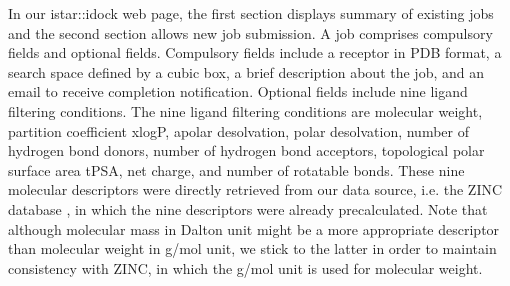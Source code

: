 In our istar::idock web page, the first section displays summary of existing jobs and the second section allows new job submission. A job comprises compulsory fields and optional fields. Compulsory fields include a receptor in PDB format, a search space defined by a cubic box, a brief description about the job, and an email to receive completion notification. Optional fields include nine ligand filtering conditions. The nine ligand filtering conditions are molecular weight, partition coefficient xlogP, apolar desolvation, polar desolvation, number of hydrogen bond donors, number of hydrogen bond acceptors, topological polar surface area tPSA, net charge, and number of rotatable bonds. These nine molecular descriptors were directly retrieved from our data source, i.e. the ZINC database \citep{532,1178}, in which the nine descriptors were already precalculated. Note that although molecular mass in Dalton unit might be a more appropriate descriptor than molecular weight in g/mol unit, we stick to the latter in order to maintain consistency with ZINC, in which the g/mol unit is used for molecular weight.

